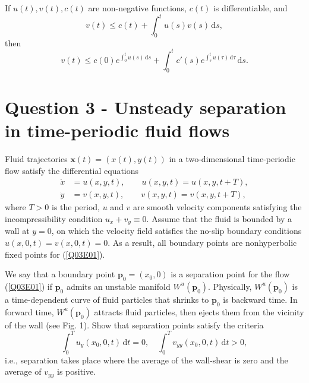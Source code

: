\documentclass[twoside,10pt,a4paper]{article}
\begin{document}
If $u(t), v(t), c(t)$ are non-negative functions, $c(t)$ is differentiable, and
\begin{equation*}
	v(t) \leq c(t) + \int_0^t u(s)v(s) \, \text{d}s,
\end{equation*}
then
\begin{equation*}
	v(t) \leq c(0) e^{\int_0^t u(s)\, \text{d}s} + \int_0^t c'(s)e^{\int_s^t u(\tau)\,\text{d}\tau}\, \text{d}s.
\end{equation*}

\section*{Question 3 - Unsteady separation in time-periodic fluid flows}
Fluid trajectories $\mathbf{x}(t) = (x(t),y(t))$ in a two-dimensional time-periodic flow satisfy the differential equations
\begin{equation}\label{Q03E01}
	\begin{aligned}
		\dot{x} &= u(x,y,t), \qquad u(x,y,t) = u(x,y,t+T), \\
		\dot{y} &= v(x,y,t), \qquad v(x,y,t) = v(x,y,t+T),
	\end{aligned}
\end{equation}
where $T>0$ is the period, $u$ and $v$ are smooth velocity components satisfying the incompressibility condition $u_x + v_y \equiv 0$. Assume that the fluid is bounded by a wall at $y=0$, on which the velocity field satisfies the no-slip boundary conditions $u(x,0,t) = v(x,0,t)=0$. As a result, all boundary points are nonhyperbolic fixed points for (\ref{Q03E01}).

We say that a boundary point $\mathbf{p}_0 = (x_0,0)$ is a separation point for the flow (\ref{Q03E01}) if $\mathbf{p}_0$ admits an unstable manifold $W^u(\mathbf{p}_0)$. Physically, $W^u(\mathbf{p}_0)$ is a time-dependent curve of fluid particles that shrinks to $\mathbf{p}_0$ is backward time. In forward time, $W^u(\mathbf{p}_0)$ attracts fluid particles, then ejects them from the vicinity of the wall (see Fig. 1). Show that separation points satisfy the criteria
\begin{equation*}
	\int_0^T u_y(x_0,0,t) \, \text{d}t = 0, \quad \int_0^T v_{yy}(x_0,0,t)\, \text{d}t > 0,
\end{equation*}
i.e., separation takes place where the average of the wall-shear is zero and the average of $v_{yy}$ is positive.
\end{document}
